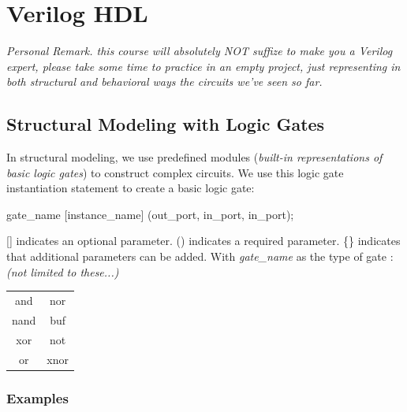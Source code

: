 \documentclass[12pt,openany]{book}
\begin{document}
\section{Verilog HDL}
					\textit{Personal Remark. this course will absolutely NOT suffize to make you a Verilog expert, please take some time to practice in an empty project, just representing in both structural and behavioral ways the circuits we've seen so far. }
			      	\subsection{Structural Modeling with Logic Gates}
			      	In structural modeling, we use predefined modules (\textit{built-in representations of basic logic gates}) to construct complex circuits.\newline
			      	\vspace{5px}
			      	We use this logic gate instantiation statement to create a basic logic gate:
\begin{vhdl}
gate_name [instance_name] (out_port, in_port{, in_port});
\end{vhdl}
			      	[] indicates an optional parameter.\newline
			      	()  indicates a required parameter. \newline
			      	\{\} indicates that additional parameters can be added. \newline
			      	\vspace*{10px}
			      	With \textit{gate\_name} as the type of gate :\newline
			      	\textit{(not limited to these...)}
			      	\begin{center}
			      		\begin{tabular}{|c|c|}
			      			\hline
			      			and  & nor  \\
			      			nand & buf  \\
			      			xor  & not  \\
			      			or   & xnor \\
			      			\hline
			      		\end{tabular}
			      	\end{center}
			      	
			      	\subsubsection{Examples}
			      	
\end{document}
